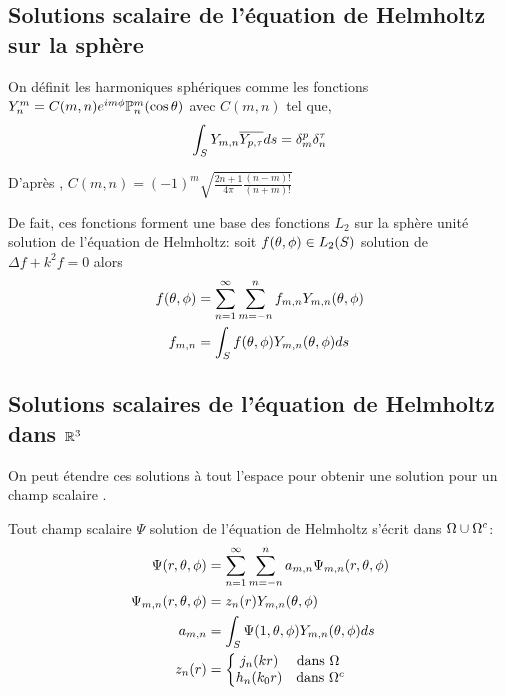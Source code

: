 \subsection{Solutions scalaire de l'équation de Helmholtz sur la sphère}

On définit les harmoniques sphériques comme les fonctions \(Y_n^m = C(m,n) e^{im\phi}\mathbb{P}^m_n(\cos \theta) \) avec \(C(m,n)\) tel que,
\[
 \displaystyle\int_S Y_{m,n} {\overline{Y_{p,\tau}}} ds = \delta_m^p \delta_n^\tau
\]

D’après \cite[p.~24]{nedelec_acoustic_2001}, \( C(m,n) = (-1)^m\sqrt{\frac{2n+1}{4\pi}\frac{(n-m)!}{(n+m)!}}\)

De fait, ces fonctions forment une base des fonctions \(L_2\) sur la sphère unité solution de l'équation de Helmholtz: soit \(f(\theta,\phi) \in L_2(S)\) solution de \( \Delta f + k^2 f = 0 \) alors
  \begin{align}
    f(\theta,\phi) &= \sum\limits_{n=1}^\infty\sum\limits_{m=-n}^n f_{m,n} Y_{m,n} (\theta,\phi)\\
    \notag f_{m,n} &= \int_S f(\theta,\phi) Y_{m,n}(\theta,\phi) ds
  \end{align}


\subsection{Solutions scalaires de l'équation de Helmholtz dans \(\mathbb R^3\)}
On peut étendre ces solutions à tout l'espace pour obtenir une solution pour un champ scalaire .

Tout champ scalaire \(\Psi\) solution de l'équation de Helmholtz s'écrit dans \(\Omega\cup\Omega^c\):
\begin{align}
\label{eq:helm:sol_helmoltz_scal_somme}
\Psi(r,\theta,\phi) &= \sum\limits_{n=1}^\infty\sum\limits_{m=-n}^n a_{m,n} \Psi_{m,n}(r,\theta,\phi) \\
\Psi_{m,n}(r,\theta,\phi) &= z_n(r) Y_{m,n}(\theta,\phi) \\
\notag a_{m,n} &= \int_S \Psi(1,\theta,\phi) Y_{m,n}(\theta,\phi) ds \\
z_n(r) &= \left\lbrace
  \begin{matrix}
  j_n(kr) &   \text{dans \(\Omega~\)} \\
  h_n(k_0r) & \text{dans \(\Omega^c\)} \\
  \end{matrix}\right.
\end{align}
